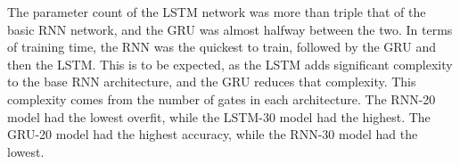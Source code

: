 \documentclass{article}
\begin{document}
\begin{enumerate}[label=1\alph*. ]
    The parameter count of the LSTM network was more than
    triple that of the basic RNN network, and the GRU was
    almost halfway between the two. In terms of training
    time, the RNN was the quickest to train, followed by the
    GRU and then the LSTM. This is to be expected, as the
    LSTM adds significant complexity to the base RNN
    architecture, and the GRU reduces that complexity. This
    complexity comes from the number of gates in each
    architecture. The RNN-20 model had the lowest overfit,
    while the LSTM-30 model had the highest. The GRU-20
    model had the highest accuracy, while the RNN-30 model
    had the lowest.
    


\end{enumerate}
\end{document}
